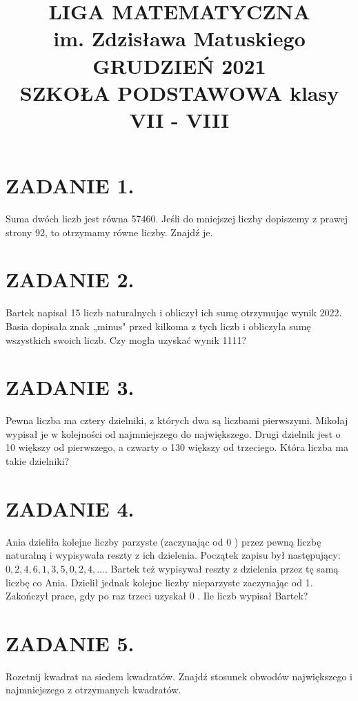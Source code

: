 \documentclass[10pt]{article}
\title{LIGA MATEMATYCZNA \\
 im. Zdzisława Matuskiego GRUDZIEŃ 2021 \\
 SZKOŁA PODSTAWOWA klasy VII - VIII }
\author{}
\date{}
\begin{document}
\maketitle
\section*{ZADANIE 1.}
Suma dwóch liczb jest równa 57460. Jeśli do mniejszej liczby dopiszemy z prawej strony 92, to otrzymamy równe liczby. Znajdź je.

\section*{ZADANIE 2.}
Bartek napisał 15 liczb naturalnych i obliczył ich sumę otrzymując wynik 2022. Basia dopisała znak „minus" przed kilkoma z tych liczb i obliczyła sumę wszystkich swoich liczb. Czy mogła uzyskać wynik 1111?

\section*{ZADANIE 3.}
Pewna liczba ma cztery dzielniki, z których dwa są liczbami pierwszymi. Mikołaj wypisał je w kolejności od najmniejszego do największego. Drugi dzielnik jest o 10 większy od pierwszego, a czwarty o 130 większy od trzeciego. Która liczba ma takie dzielniki?

\section*{ZADANIE 4.}
Ania dzieliła kolejne liczby parzyste (zaczynając od 0 ) przez pewną liczbę naturalną i wypisywała reszty z ich dzielenia. Początek zapisu był następujący: \(0,2,4,6,1,3,5,0,2,4, \ldots\). Bartek też wypisywał reszty z dzielenia przez tę samą liczbę co Ania. Dzielił jednak kolejne liczby nieparzyste zaczynając od 1. Zakończył prace, gdy po raz trzeci uzyskał 0 . Ile liczb wypisał Bartek?

\section*{ZADANIE 5.}
Rozetnij kwadrat na siedem kwadratów. Znajdź stosunek obwodów największego i najmniejszego z otrzymanych kwadratów.
\end{document}
